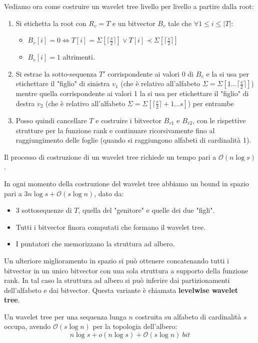 Vediamo ora come costruire un wavelet tree livello per livello a partire dalla root:
\begin{enumerate}
    \item Si etichetta la root con $R_v = T$ e un bitvector $B_v$ tale che $\forall 1 \leq i \leq |T|$: 
    \begin{itemize}
        \item $B_v[i] = 0 \iff T[i] = \Sigma[\lceil \frac{s}{2} \rceil] \lor T[i] \prec \Sigma[\lceil \frac{s}{2} \rceil]$
        \item $B_v[i] = 1$ altrimenti.
    \end{itemize}
    \item Si estrae la sotto-sequenza $T'$ corrispondente ai valori 0 di $B_v$ e la si usa per etichettare il "figlio" di sinistra $v_1$ (che è relativo all'alfabeto $\Sigma = \Sigma[1 \dots \lceil \frac{s}{2} \rceil]$) mentre quella corrispondente ai valori 1 la si usa per etichettare il "figlio" di destra $v_2$ (che è relativo all'alfabeto $\Sigma = \Sigma[\lceil \frac{s}{2} \rceil + 1 \dots s]$) per entrambe
    \item Posso quindi cancellare $T$ e costruire i bitvector $B_{v1}$ e $B_{v2}$, con le rispettive strutture per la funzione rank e continuare ricorsivamente fino al raggiungimento delle foglie (quando si raggiungono alfabeti di cardinalità 1).
\end{enumerate}
Il processo di costruzione di un wavelet tree richiede un tempo pari a $\mathcal{O}(n \log s)$.

In ogni momento della costruzione del wavelet tree abbiamo un bound in spazio pari a $3n \log s + \mathcal{O}(s \log n)$, dato da:
\begin{itemize}
    \item 3 sottosequenze di $T$, quella del "genitore" e quelle dei due "figli".
    \item Tutti i bitvector finora computati che formano il wavelet tree.
    \item I puntatori che memorizzano la struttura ad albero.
\end{itemize}

Un ulteriore miglioramento in spazio si può ottenere concatenando tutti i bitvector in un unico bitvector con una sola struttura a supporto della funzione rank. In tal caso la struttura ad albero si può inferire dai partizionamenti dell'alfabeto e dai bitvector. Questa variante è chiamata \textbf{levelwise wavelet tree}.

Un wavelet tree per una sequenza lunga $n$ costruita su alfabeto di cardinalità $s$ occupa, avendo $\mathcal{O}(s \log n)$ per la topologia dell'albero:
\begin{equation}
    n \log s + o(n \log s) + \mathcal{O}(s \log n) \ bit
\end{equation}

